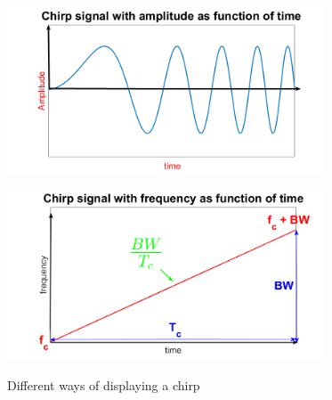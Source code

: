 \begin{figure}[h] 
    \begin{minipage}[b]{.49\linewidth}
        \includegraphics[height=5cm,width=\linewidth]{imgs/chapter2/chirpAt.png}
        \label{fig:At}
    \end{minipage}
    \begin{minipage}[b]{.49\linewidth}
        \includegraphics[height=5cm,width=\linewidth]{imgs/chapter2/chirpFt.png}
        \label{fig:Ft}
    \end{minipage}
    \caption{Different ways of displaying a chirp}
    \label{fig:robotslidar}
\end{figure}



